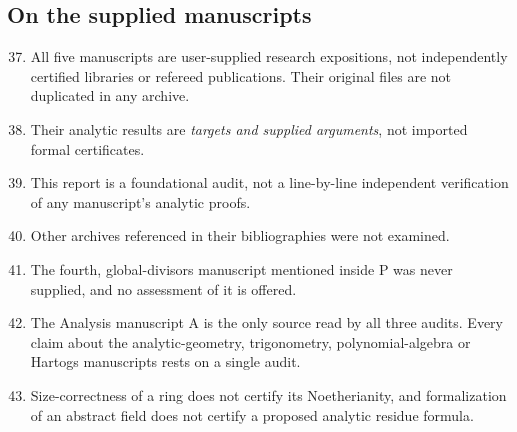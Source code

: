 \documentclass[11pt,letterpaper]{article}
\numberwithin{equation}{section}
\theoremstyle{definition}
\theoremstyle{remark}
\begin{document}
\subsection{On the supplied manuscripts}
\label{found:app:limmanuscripts}
\begin{enumerate}\setcounter{enumi}{36}
\item All five manuscripts are user-supplied research expositions, not
independently certified libraries or refereed publications. Their original files
are not duplicated in any archive.
\item Their analytic results are \emph{targets and supplied arguments}, not
imported formal certificates.
\item This report is a foundational audit, not a line-by-line independent
verification of any manuscript's analytic proofs.
\item Other archives referenced in their bibliographies were not examined.
\item The fourth, global-divisors manuscript mentioned inside P was never
supplied, and no assessment of it is offered.
\item The Analysis manuscript A is the only source read by all three audits.
Every claim about the analytic-geometry, trigonometry, polynomial-algebra or
Hartogs manuscripts rests on a single audit.
\item Size-correctness of a ring does not certify its Noetherianity, and
formalization of an abstract field does not certify a proposed analytic residue
formula.
\end{enumerate}
\end{document}
